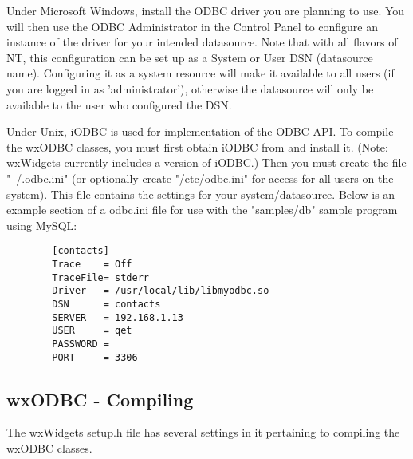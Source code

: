 Under Microsoft Windows, install the ODBC driver you are planning to use. You 
will then use the ODBC Administrator in the Control Panel to configure an 
instance of the driver for your intended datasource. Note that with all 
flavors of NT, this configuration can be set up as a System or User DSN 
(datasource name). Configuring it as a system resource will make it 
available to all users (if you are logged in as 'administrator'), otherwise 
the datasource will only be available to the user who configured the DSN.

Under Unix, iODBC is used for implementation of the ODBC API. To compile the 
wxODBC classes, you must first obtain iODBC from  and install it. 
(Note: wxWidgets currently includes a version of iODBC.) Then you must create the file "~/.odbc.ini" (or optionally create 
"/etc/odbc.ini" for access for all users on the system). This file contains 
the settings for your system/datasource. Below is an example section of a 
odbc.ini file for use with the "samples/db" sample program using MySQL:

\begin{verbatim}
        [contacts]
        Trace    = Off
        TraceFile= stderr
        Driver   = /usr/local/lib/libmyodbc.so
        DSN      = contacts
        SERVER   = 192.168.1.13
        USER     = qet
        PASSWORD = 
        PORT     = 3306
\end{verbatim}

\subsection{wxODBC - Compiling}\label{wxodbccompiling}

The wxWidgets setup.h file has several settings in it pertaining to compiling 
the wxODBC classes.

